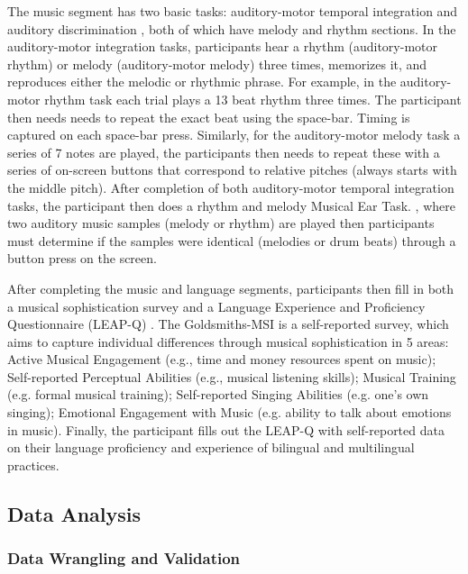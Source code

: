 \documentclass[a4paper]{article}
\begin{document}
The music segment has two basic tasks: auditory-motor temporal integration \cite{Kachlicka_Saito_Tierney_2019} and auditory discrimination \cite[Musical Ear Task]{Wallentin_Nielsen_Friis-Olivarius_Vuust_Vuust_2010}, both of which have melody and rhythm sections. In the auditory-motor integration tasks, participants hear a rhythm (auditory-motor rhythm) or melody (auditory-motor melody) three times, memorizes it, and reproduces either the melodic or rhythmic phrase. For example, in the auditory-motor rhythm task each trial plays a 13 beat rhythm three times. The participant then needs needs to repeat the exact beat using the space-bar. Timing is captured on each space-bar press. Similarly, for the auditory-motor melody task a series of 7 notes are played, the participants then needs to repeat these with a series of on-screen buttons that correspond to relative pitches (always starts with the middle pitch). After completion of both auditory-motor temporal integration tasks, the participant then does a rhythm and melody Musical Ear Task. \cite{Wallentin_Nielsen_Friis-Olivarius_Vuust_Vuust_2010}, where two auditory music samples (melody or rhythm) are played then participants must determine if the samples were identical (melodies or drum beats) through a button press on the screen. 

After completing the music and language segments, participants then fill in both a musical sophistication survey \cite[Goldsmiths-MSI]{Müllensiefen_Gingras_Musil_Stewart_2014} and a Language Experience and Proficiency Questionnaire (LEAP-Q) \cite{Marian_Blumenfeld_Kaushanskaya_2007}. The Goldsmiths-MSI is a self-reported survey, which aims to capture individual differences through musical sophistication in 5 areas: Active Musical Engagement (e.g., time and money resources spent on music); Self-reported Perceptual Abilities (e.g., musical listening skills); Musical Training (e.g. formal musical training); Self-reported Singing Abilities (e.g. one’s own singing); Emotional Engagement with Music (e.g. ability to talk about emotions in music). Finally, the participant fills out the LEAP-Q with self-reported data on their language proficiency and experience of bilingual and multilingual practices. 

\subsection{Data Analysis}
\subsubsection{Data Wrangling and Validation}
\end{document}
